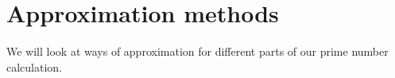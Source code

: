 \chapter{Approximation methods}
\label{ch:approximationmethods}
\minitoc
We will look at ways of approximation for different parts of our prime number calculation.
